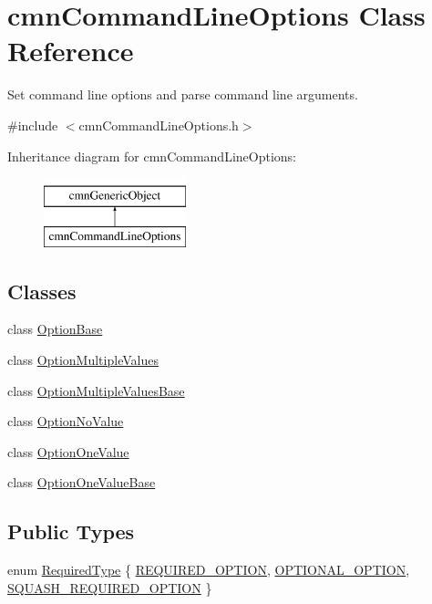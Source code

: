 \hypertarget{classcmn_command_line_options}{}\section{cmn\+Command\+Line\+Options Class Reference}
\label{classcmn_command_line_options}


Set command line options and parse command line arguments.  




{\ttfamily \#include $<$cmn\+Command\+Line\+Options.\+h$>$}

Inheritance diagram for cmn\+Command\+Line\+Options\+:\begin{figure}[H]
\begin{center}
\leavevmode
\includegraphics[height=2.000000cm]{d7/de9/classcmn_command_line_options}
\end{center}
\end{figure}
\subsection*{Classes}
\begin{DoxyCompactItemize}
\item 
class \hyperlink{classcmn_command_line_options_1_1_option_base}{Option\+Base}
\item 
class \hyperlink{classcmn_command_line_options_1_1_option_multiple_values}{Option\+Multiple\+Values}
\item 
class \hyperlink{classcmn_command_line_options_1_1_option_multiple_values_base}{Option\+Multiple\+Values\+Base}
\item 
class \hyperlink{classcmn_command_line_options_1_1_option_no_value}{Option\+No\+Value}
\item 
class \hyperlink{classcmn_command_line_options_1_1_option_one_value}{Option\+One\+Value}
\item 
class \hyperlink{classcmn_command_line_options_1_1_option_one_value_base}{Option\+One\+Value\+Base}
\end{DoxyCompactItemize}
\subsection*{Public Types}
\begin{DoxyCompactItemize}
\item 
enum \hyperlink{group__cisst_common_gac239a3ca62dd4e3b391824f6f1a97c76}{Required\+Type} \{ \hyperlink{group__cisst_common_ggac239a3ca62dd4e3b391824f6f1a97c76a18dad98cb48d91b0fe8ee13a54dc45ff}{R\+E\+Q\+U\+I\+R\+E\+D\+\_\+\+O\+P\+T\+I\+O\+N}, 
\hyperlink{group__cisst_common_ggac239a3ca62dd4e3b391824f6f1a97c76a6734a70bf0045a4c08605f3ae473d533}{O\+P\+T\+I\+O\+N\+A\+L\+\_\+\+O\+P\+T\+I\+O\+N}, 
\hyperlink{group__cisst_common_ggac239a3ca62dd4e3b391824f6f1a97c76a4078a310faff7e3930603320a15248f7}{S\+Q\+U\+A\+S\+H\+\_\+\+R\+E\+Q\+U\+I\+R\+E\+D\+\_\+\+O\+P\+T\+I\+O\+N}
 \}
\end{DoxyCompactItemize}
